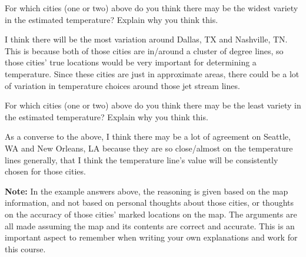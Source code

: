 \documentclass[12pt]{ximera}
\begin{document}
\begin{problem}
For which cities (one or two) above do you think there may be the widest variety in the
estimated temperature? Explain why you think this.

\begin{freeResponse}
\end{freeResponse}

\begin{solution}
I think there will be the most variation around Dallas, TX and Nashville, TN. This is
because both of those cities are in/around a cluster of degree lines, so those cities'
true locations would be very important for determining a temperature. Since these
cities are just in approximate areas, there could be a lot of variation in temperature
choices around those jet stream lines.
\end{solution}
\end{problem}

\begin{problem}
For which cities (one or two) above do you think there may be the least variety in the
estimated temperature? Explain why you think this.

\begin{freeResponse}
\end{freeResponse}

\begin{solution}
As a converse to the above, I think there may be a lot of agreement on Seattle, WA and
New Orleans, LA because they are so close/almost on the temperature lines generally,
that I think the temperature line's value will be consistently chosen for those cities.

\textbf{Note:} In the example answers above, the reasoning is given based on the map
information, and not based on personal thoughts about those cities, or thoughts on the
accuracy of those cities' marked locations on the map. The arguments are all made
assuming the map and its contents are correct and accurate. This is an important aspect
to remember when writing your own explanations and work for this course.
\end{solution}
\end{problem}
\end{document}

